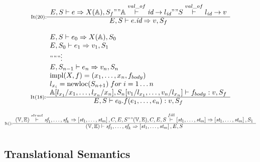 {\[
\inference[It(20):]{
E,S|-e=>X(\mathbb{A}),S_f "" \mathbb{A} \overset{val\_of}{|-} \textit{id} -> l_{\textit{id}} "" S \overset{val\_of}{|-} l_{\textit{id}} -> v
}
{E,S|-e.\textit{id}=>v,S_f}
\]

\[
\inference[It(18):]{
E,S|-e_0=>X(\mathbb{A}),S_0 \\
E,S_0|-e_1=>v_1,S_1 \\
""" \vdots \\
E,S_{n-1}|-e_n=>v_n,S_n \\
\operatorname{impl}(X,f) = (x_1, \dots, x_n, f_{body}) \\
l_{x_i} = \operatorname{newloc}(S_{n+1}) \; for \; i = 1 \dots n \\
\mathbb{A}[l_{x_1}/x_1, \dots, l_{x_n}/x_n],S_n[v_1/l_{x_1}, \dots, v_n/l_{x_n}]|-f_{body}:v,S_f
}
{E,S|-e_0.f(e_1, \dots, e_n):v,S_f}
\]

%

\[
\inference[It():]{
\mathbb{(V,E)} \overset{struct}{|-} \textit{sf}_1, \dots, \textit{sf}_k => \left[ \textit{st}_1, \dots, \textit{st}_m \right],C,E,S "" \mathbb{(V,E)},C,E,S\overset{fill}{|-} \left[ \textit{st}_1, \dots, \textit{st}_m \right] => \left[ \textit{st}_1, \dots, \textit{st}_m \right], S_1
}{
\mathbb{(V,E)}|- \textit{sf}_1, \dots, \textit{sf}_k => \left[ \textit{st}_1, \dots, \textit{st}_m \right], E, S
}
\]

}



\mathligsoff

\fi

\subsection{Translational Semantics}\label{sec:translational-semantic}

